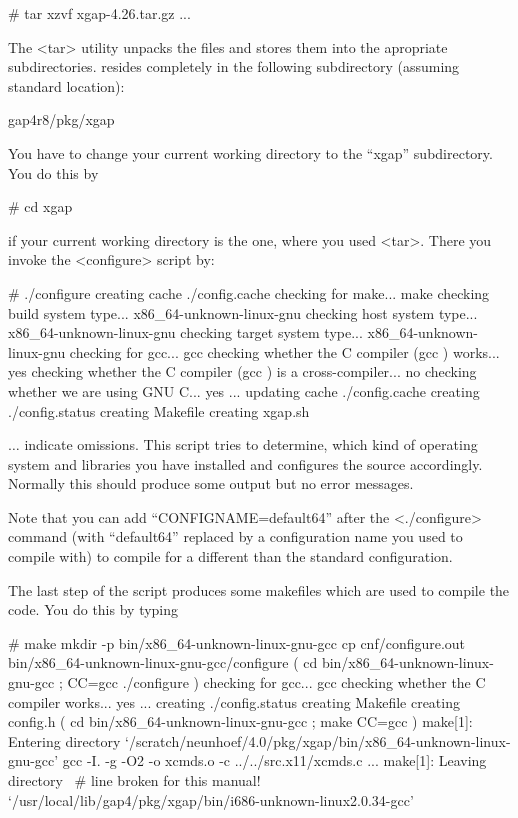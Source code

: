\begintt
# tar xzvf xgap-4.26.tar.gz
...
\endtt

The <tar> utility unpacks the files and stores them into the apropriate
subdirectories. {\XGAP} resides completely in the following subdirectory
(assuming standard location):

\begintt
gap4r8/pkg/xgap
\endtt


You have to change your current working directory to the ``xgap''
subdirectory. You do this by

\begintt
# cd xgap
\endtt

if your current working directory is the one, where you used
<tar>. There you invoke the <configure> script by:

\begintt
# ./configure
creating cache ./config.cache
checking for make... make
checking build system type... x86_64-unknown-linux-gnu
checking host system type... x86_64-unknown-linux-gnu
checking target system type... x86_64-unknown-linux-gnu
checking for gcc... gcc
checking whether the C compiler (gcc  ) works... yes
checking whether the C compiler (gcc  ) is a cross-compiler... no
checking whether we are using GNU C... yes
...
updating cache ./config.cache
creating ./config.status
creating Makefile
creating xgap.sh
\endtt

$\ldots$ indicate omissions. 
This script tries to determine, which kind of operating system and
libraries you have installed and configures the source
accordingly. Normally this should produce some output but no error
messages. 

Note that you can add ``CONFIGNAME=default64'' after the <./configure>
command (with ``default64'' replaced by a configuration name you used
to compile {\GAP} with) to compile for a different than the standard
configuration.

The last step of the script produces some makefiles which are
used to compile the code. You do this by typing

\begintt
# make
mkdir -p bin/x86_64-unknown-linux-gnu-gcc
cp cnf/configure.out bin/x86_64-unknown-linux-gnu-gcc/configure
( cd bin/x86_64-unknown-linux-gnu-gcc ; CC=gcc ./configure  )
checking for gcc... gcc
checking whether the C compiler works... yes
...
creating ./config.status
creating Makefile
creating config.h
( cd bin/x86_64-unknown-linux-gnu-gcc ; make CC=gcc )
make[1]: Entering directory 
`/scratch/neunhoef/4.0/pkg/xgap/bin/x86_64-unknown-linux-gnu-gcc'
gcc -I. -g -O2   -o xcmds.o -c ../../src.x11/xcmds.c
...
make[1]: Leaving directory \                    # line broken for this manual!
     `/usr/local/lib/gap4/pkg/xgap/bin/i686-unknown-linux2.0.34-gcc'
\endtt

